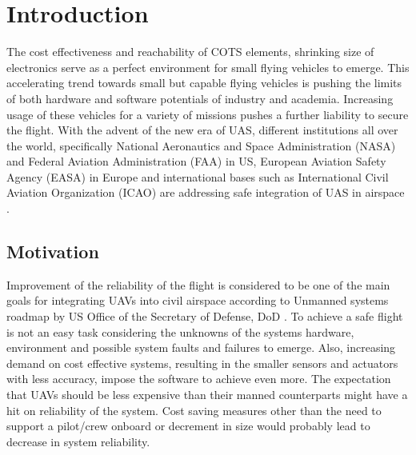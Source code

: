 
\chapter{Introduction}

The cost effectiveness and reachability of COTS elements, shrinking size of electronics serve as a perfect environment for small flying vehicles to emerge. 
This accelerating trend towards small but capable flying vehicles is pushing the limits of both hardware and software potentials of industry and academia. 
Increasing usage of these vehicles for a variety of missions pushes a further liability to secure the flight. With the advent of the new era of UAS, different institutions all over the world, specifically National Aeronautics and Space Administration (NASA) 
\cite{kopardekarunmanned} and Federal Aviation Administration (FAA) \cite{FAA_UASintegration} in US, European Aviation Safety Agency (EASA) \cite{A_NPA_EASA2015} in Europe and international bases such as International Civil Aviation Organization (ICAO) \cite{ICAO_Circular} are addressing safe integration of UAS in airspace \cite{baskaya2016flexible}.

\section{Motivation}

Improvement of the reliability of the flight is considered to be one of the main goals for integrating UAVs into civil airspace according to Unmanned systems roadmap by US Office of the Secretary of Defense, DoD \cite{UnmannedSystemsRoadmapDoD}. 
To achieve a safe flight is not an easy task considering the unknowns of the systems hardware, environment and possible system faults and failures to emerge. 
Also, increasing demand on cost effective systems, resulting in the smaller sensors and actuators with less accuracy, impose the software to achieve even more. 
The expectation that UAVs should be less expensive than their manned counterparts might have a hit on reliability of the system. Cost saving measures other than the need to support a pilot/crew onboard or decrement in size would probably lead to decrease in system reliability.

